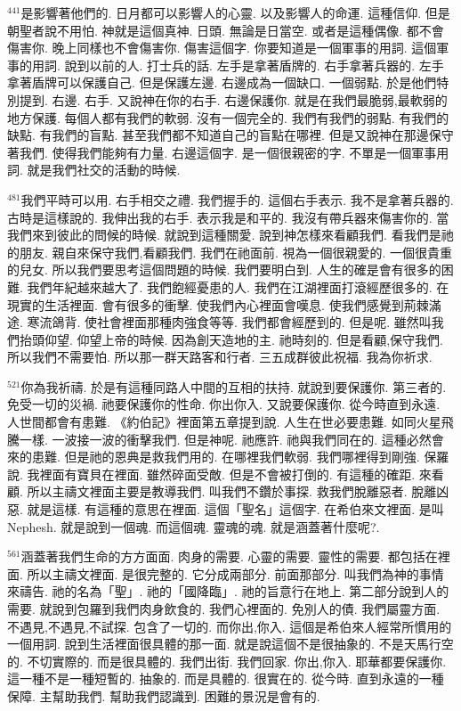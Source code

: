 \documentclass{book}
\begin{document}
$^{441}$是影響著他們的.
日月都可以影響人的心靈.
以及影響人的命運.
這種信仰.
但是朝聖者說不用怕.
神就是這個真神.
日頭.
無論是日當空.
或者是這種偶像.
都不會傷害你.
晚上同樣也不會傷害你.
傷害這個字.
你要知道是一個軍事的用詞.
這個軍事的用詞.
說到以前的人.
打士兵的話.
左手是拿著盾牌的.
右手拿著兵器的.
左手拿著盾牌可以保護自己.
但是保護左邊.
右邊成為一個缺口.
一個弱點.
於是他們特別提到.
右邊.
右手.
又說神在你的右手.
右邊保護你.
就是在我們最脆弱,最軟弱的地方保護.
每個人都有我們的軟弱.
沒有一個完全的.
我們有我們的弱點.
有我們的缺點.
有我們的盲點.
甚至我們都不知道自己的盲點在哪裡.
但是又說神在那邊保守著我們.
使得我們能夠有力量.
右邊這個字.
是一個很親密的字.
不單是一個軍事用詞.
就是我們社交的活動的時候.

$^{481}$我們平時可以用.
右手相交之禮.
我們握手的.
這個右手表示.
我不是拿著兵器的.
古時是這樣說的.
我伸出我的右手.
表示我是和平的.
我沒有帶兵器來傷害你的.
當我們來到彼此的問候的時候.
就說到這種關愛.
說到神怎樣來看顧我們.
看我們是祂的朋友.
親自來保守我們,看顧我們.
我們在祂面前.
視為一個很親愛的.
一個很貴重的兒女.
所以我們要思考這個問題的時候.
我們要明白到.
人生的確是會有很多的困難.
我們年紀越來越大了.
我們飽經憂患的人.
我們在江湖裡面打滾經歷很多的.
在現實的生活裡面.
會有很多的衝擊.
使我們內心裡面會嘆息.
使我們感覺到荊棘滿途.
寒流鴿背.
使社會裡面那種肉強食等等.
我們都會經歷到的.
但是呢.
雖然叫我們抬頭仰望.
仰望上帝的時候.
因為創天造地的主.
祂時刻的.
但是看顧,保守我們.
所以我們不需要怕.
所以那一群天路客和行者.
三五成群彼此祝福.
我為你祈求.

$^{521}$你為我祈禱.
於是有這種同路人中間的互相的扶持.
就說到要保護你.
第三者的.
免受一切的災禍.
祂要保護你的性命.
你出你入.
又說要保護你.
從今時直到永遠.
人世間都會有患難.
《約伯記》裡面第五章提到說.
人生在世必要患難.
如同火星飛騰一樣.
一波接一波的衝擊我們.
但是神呢.
祂應許.
祂與我們同在的.
這種必然會來的患難.
但是祂的恩典是救我們用的.
在哪裡我們軟弱.
我們哪裡得到剛強.
保羅說.
我裡面有寶貝在裡面.
雖然碎面受敵.
但是不會被打倒的.
有這種的確距.
來看顧.
所以主禱文裡面主要是教導我們.
叫我們不鑽於事探.
救我們脫離惡者.
脫離凶惡.
就是這樣.
有這種的意思在裡面.
這個「聖名」這個字.
在希伯來文裡面.
是叫Nephesh.
就是說到一個魂.
而這個魂.
靈魂的魂.
就是涵蓋著什麼呢?.

$^{561}$涵蓋著我們生命的方方面面.
肉身的需要.
心靈的需要.
靈性的需要.
都包括在裡面.
所以主禱文裡面.
是很完整的.
它分成兩部分.
前面那部分.
叫我們為神的事情來禱告.
祂的名為「聖」.
祂的「國降臨」.
祂的旨意行在地上.
第二部分說到人的需要.
就說到包羅到我們肉身飲食的.
我們心裡面的.
免別人的債.
我們屬靈方面.
不遇見,不遇見,不試探.
包含了一切的.
而你出,你入.
這個是希伯來人經常所慣用的一個用詞.
說到生活裡面很具體的那一面.
就是說這個不是很抽象的.
不是天馬行空的.
不切實際的.
而是很具體的.
我們出街.
我們回家.
你出,你入.
耶華都要保護你.
這一種不是一種短暫的.
抽象的.
而是具體的.
很實在的.
從今時.
直到永遠的一種保障.
主幫助我們.
幫助我們認識到.
困難的景況是會有的.
\end{document}
